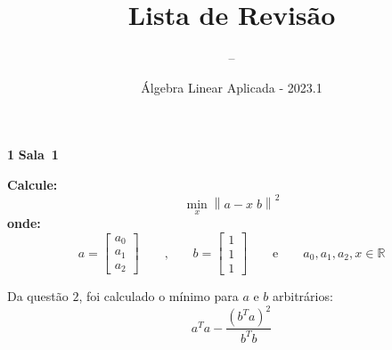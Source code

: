 \documentclass{article}
\title{Lista de Revisão}
\author{\hashi{} -- \dre{}}
\date{Álgebra Linear Aplicada - 2023.1}
\newcommand{\R}{\mathbb{R}}
\newenvironment{question}
    {\medskip\bfseries\large}
    {\medskip}
\newcounter{exe-list}
\newenvironment{exe}[2][Sala]
    {\bigskip\noindent\par\ifthenelse{\equal{#1}{}}%
        {\textbf{\LARGE #2}}%
        {\textbf{\LARGE #1~#2}}%
    \medskip\noindent\par}
    {\bigskip}
\begin{document}
\maketitle

\begin{exe}{1}
    \begin{question}
        Calcule:
        \[
            \min_x \left\|
                a - x \; b
            \right\|^2
        \]
        onde:
        \[
            a = \begin{bmatrix}
                a_0 \\ a_1 \\ a_2
            \end{bmatrix}
            \qquad\text{,}\qquad
            b = \begin{bmatrix}
                1 \\ 1 \\ 1
            \end{bmatrix}
            \qquad\text{e}\qquad
            a_0, a_1, a_2, x \in \R
        \]
    \end{question}

    Da questão \(2\), foi calculado o mínimo
    para \(a\) e \(b\) arbitrários:
    \[
        a^T a - \frac{(b^T a)^2}{b^T b}
    \]


\end{exe}
\end{document}
